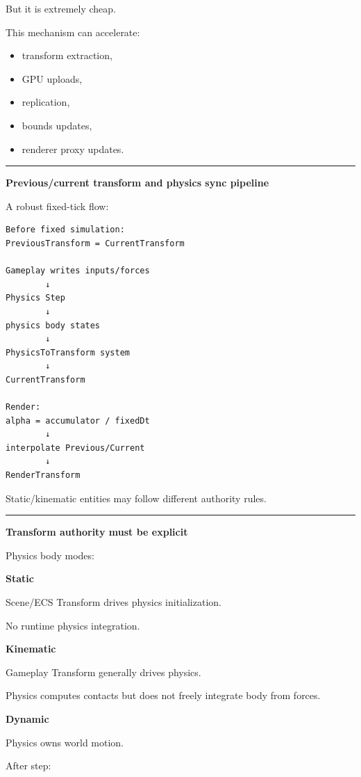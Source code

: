 But it is extremely cheap.

This mechanism can accelerate:

\begin{itemize}
\tightlist
\item
  transform extraction,
\item
  GPU uploads,
\item
  replication,
\item
  bounds updates,
\item
  renderer proxy updates.
\end{itemize}

\begin{center}\rule{0.5\linewidth}{0.5pt}\end{center}

\textbf{Previous/current transform and physics sync pipeline}

A robust fixed-tick flow:

\begin{verbatim}
Before fixed simulation:
PreviousTransform = CurrentTransform

Gameplay writes inputs/forces
        ↓
Physics Step
        ↓
physics body states
        ↓
PhysicsToTransform system
        ↓
CurrentTransform

Render:
alpha = accumulator / fixedDt
        ↓
interpolate Previous/Current
        ↓
RenderTransform
\end{verbatim}

Static/kinematic entities may follow different authority rules.

\begin{center}\rule{0.5\linewidth}{0.5pt}\end{center}

\textbf{Transform authority must be explicit}

Physics body modes:

\textbf{Static}

Scene/ECS Transform drives physics initialization.

No runtime physics integration.

\textbf{Kinematic}

Gameplay Transform generally drives physics.

Physics computes contacts but does not freely integrate body from forces.

\textbf{Dynamic}

Physics owns world motion.

After step:

